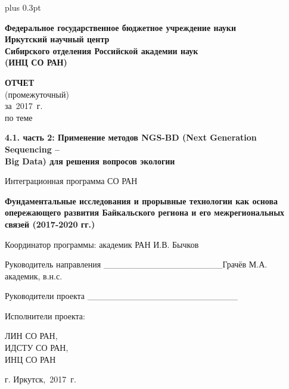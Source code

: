 \documentclass[a4paper,12pt,openany,final]{extreport}
\date{}
\newcommand\theyear{2017}
\providecommand{\appendixname}{}
\renewcommand{\appendixname}{ПРИЛОЖЕНИЕ}
\begin{document}

\parskip=0pt plus 0.3pt

\pagestyle{plain}
\renewcommand{\bibname}{\appendixname~I.~Список использованных источников}
\renewcommand{\chaptername}{ГЛАВА}
\newcommand{\capfont}{\Large\sffamily\sfcpshape\bfseries}
\begin{titlepage}
\thispagestyle{empty}
\begin{center}

\textbf{Федеральное государственное бюджетное учреждение науки\\
Иркутский научный центр\\
Сибирского отделения Российской академии наук\\
(ИНЦ СО РАН)}

\vfill

\textbf{\large ОТЧЕТ}\\
(промежуточный)\\
за~\theyear{}~г.\\
по теме

\textbf{\large 4.1. часть 2: Применение методов NGS-BD (Next Generation Sequencing --\\Big Data) для решения вопросов экологии}
\vspace{2em}

Интеграционная программа СО РАН

\textbf{Фундаментальные исследования и прорывные технологии как основа
опережающего развития Байкальского региона и его межрегиональных связей
(2017-2020 гг.)}
\vspace{1em}

Координатор программы: академик РАН И.В. Бычков
\end{center}
\vspace{1em}

Руководитель направления \_\_\_\_\_\_\_\_\_\_\_\_\_\_\_\_\_\_\_{Грачёв
М.А. академик, в.н.с.}

\vspace{1em}
Руководители проекта \_\_\_\_\_\_\_\_\_\_\_\_\_\_\_\_\_\_\_\_\_\_\_\_

\vspace{1em}
\begin{multicols}{3}
  Исполнители проекта:

  \vfill\null
  \columnbreak

\mbox{}\vfill\null
  \columnbreak

\noindent{}ЛИН СО РАН,\\
ИДСТУ СО РАН,\\
ИНЦ СО РАН
\end{multicols}

\vfill
\begin{center}
г. Иркутск,~\theyear{}~г.
\end{center}
\end{titlepage}
\end{document}
